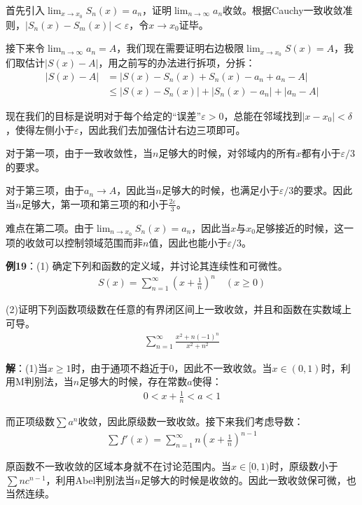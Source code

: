 \documentclass{ctexart}
\let\oldtextbf\textbf
\renewcommand{\textbf}[1]{\textcolor{brown!50!red}{\oldtextbf{#1}}}
\begin{document}
首先引入$\lim_{x\to x_0}S_n(x)=a_n$，证明$\lim _{n\to\infty} a_n$收敛。根据Cauchy一致收敛准则，$|S_n(x)-S_m(x)|<\varepsilon$，令$x\to x_0$证毕。

接下来令$\lim_{n\to\infty} a_n=A$，我们现在需要证明右边极限$\lim_{x\to x_0} S(x)=A$，我们取估计$|S(x)-A|$，用之前写的办法进行拆项，分拆：
\begin{align*}
  |S(x)-A|&=|S(x)-S_n(x)+S_n(x)-a_n+a_n-A|\\
&\leq|S(x)-S_n(x)|+|S_n(x)-a_n|+|a_n-A|
\end{align*}

现在我们的目标是说明对于每个给定的“误差”$\varepsilon>0$，总能在邻域找到$|x-x_0|<\delta$，使得左侧小于$\varepsilon$，因此我们去加强估计右边三项即可。

对于第一项，由于一致收敛性，当$n$足够大的时候，对邻域内的所有$x$都有小于$\varepsilon/3$的要求。

对于第三项，由于$a_n\to A$，因此当$n$足够大的时候，也满足小于$\varepsilon/3$的要求。因此当$n$足够大，第一项和第三项的和小于$\frac{2\varepsilon}{3}$。

难点在第二项。由于$\lim_{n\to x_0}S_n(x)=a_n$，因此当$x$与$x_0$足够接近的时候，这一项的收敛可以控制领域范围而非$n$值，因此也能小于$\varepsilon/3$。

\textbf{\color{brown!50!red}例19}：(1) 确定下列和函数的定义域，并讨论其连续性和可微性。
\begin{align*}
    S(x)=\sum_{n=1}^\infty (x+\frac{1}{n})^n\quad(x\geq 0)
\end{align*}

(2)证明下列函数项级数在任意的有界闭区间上一致收敛，并且和函数在实数域上可导。
\begin{align*}
    \sum_{n=1}^\infty\frac{x^2+n(-1)^n}{x^2+n^2}
\end{align*}

\textbf{\color{brown!50!red}解}：(1)当$x\geq 1$时，由于通项不趋近于0，因此不一致收敛。当$x\in(0,1)$时，利用M判别法，当$n$足够大的时候，存在常数$a$使得：
\begin{align*}
    0<x+\frac{1}{n}<a<1
\end{align*}

而正项级数$\sum a^n$收敛，因此原级数一致收敛。接下来我们考虑导数：
\begin{align*}
    \sum f'(x)=\sum_{n=1}^\infty n(x+\frac{1}{n})^{n-1}
\end{align*}

原函数不一致收敛的区域本身就不在讨论范围内。当$x\in[0,1)$时，原级数小于$\sum nc^{n-1}$，利用Abel判别法当$n$足够大的时候是收敛的。因此一致收敛保可微，也当然连续。
\end{document}
